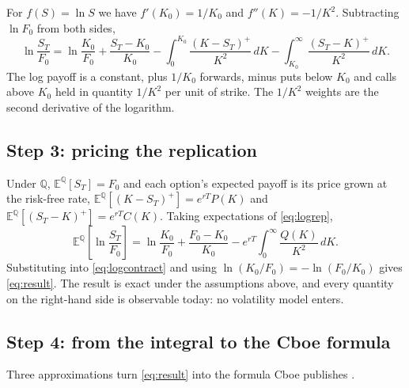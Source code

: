 \documentclass[12pt]{article}
\newcommand{\E}{\mathbb{E}^{\mathbb{Q}}}
\begin{document}
For $f(S)=\ln S$ we have $f'(K_0)=1/K_0$ and $f''(K)=-1/K^2$. Subtracting $\ln F_0$ from both sides,
\begin{equation}
  \ln\frac{S_T}{F_0} = \ln\frac{K_0}{F_0} + \frac{S_T-K_0}{K_0}
  - \int_0^{K_0}\frac{(K-S_T)^+}{K^2}\,dK
  - \int_{K_0}^{\infty}\frac{(S_T-K)^+}{K^2}\,dK .
  \label{eq:logrep}
\end{equation}
The log payoff is a constant, plus $1/K_0$ forwards, minus puts below $K_0$ and calls above $K_0$ held in quantity $1/K^2$ per unit of strike. The $1/K^2$ weights are the second derivative of the logarithm.

\subsection{Step 3: pricing the replication}

Under $\mathbb{Q}$, $\E[S_T]=F_0$ and each option's expected payoff is its price grown at the risk-free rate, $\E[(K-S_T)^+]=e^{rT}P(K)$ and $\E[(S_T-K)^+]=e^{rT}C(K)$. Taking expectations of \eqref{eq:logrep},
\begin{equation}
  \E\!\left[\ln\frac{S_T}{F_0}\right] = \ln\frac{K_0}{F_0} + \frac{F_0-K_0}{K_0}
  - e^{rT}\int_0^{\infty}\frac{Q(K)}{K^2}\,dK .
\end{equation}
Substituting into \eqref{eq:logcontract} and using $\ln(K_0/F_0)=-\ln(F_0/K_0)$ gives \eqref{eq:result}. The result is exact under the assumptions above, and every quantity on the right-hand side is observable today: no volatility model enters.

\subsection{Step 4: from the integral to the Cboe formula}

Three approximations turn \eqref{eq:result} into the formula Cboe publishes \cite{cboewp,cboemeth}.
\end{document}
